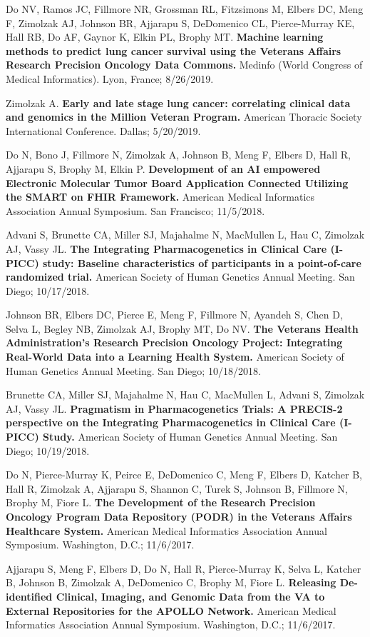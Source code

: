 \documentclass[10pt]{article}
\begin{document}
Do NV, Ramos JC, Fillmore NR, Grossman RL, Fitzsimons M, Elbers DC,
Meng F, Zimolzak AJ, Johnson BR, Ajjarapu S, DeDomenico CL,
Pierce-Murray KE, Hall RB, Do AF, Gaynor K, Elkin PL, Brophy MT.
\textbf{Machine learning methods to predict lung cancer survival using
  the Veterans Affairs Research Precision Oncology Data Commons.}
Medinfo (World Congress of Medical Informatics). Lyon, France;
8/26/2019.

Zimolzak A. \textbf{Early and late stage lung cancer: correlating
  clinical data and genomics in the Million Veteran Program.} American
Thoracic Society International Conference. Dallas; 5/20/2019.

Do N, Bono J, Fillmore N, Zimolzak A, Johnson B, Meng F, Elbers D,
Hall R, Ajjarapu S, Brophy M, Elkin P. \textbf{Development of an AI
  empowered Electronic Molecular Tumor Board Application Connected
  Utilizing the SMART on FHIR Framework.} American Medical Informatics
Association Annual Symposium. San Francisco; 11/5/2018.

Advani S, Brunette CA, Miller SJ, Majahalme N, MacMullen L, Hau C,
Zimolzak AJ, Vassy JL. \textbf{The Integrating Pharmacogenetics in
  Clinical Care (I-PICC) study: Baseline characteristics of
  participants in a point-of-care randomized trial.} American Society
of Human Genetics Annual Meeting. San Diego; 10/17/2018.

Johnson BR, Elbers DC, Pierce E, Meng F, Fillmore N, Ayandeh S, Chen
D, Selva L, Begley NB, Zimolzak AJ, Brophy MT, Do NV. \textbf{The
  Veterans Health Administration's Research Precision Oncology
  Project: Integrating Real-World Data into a Learning Health System.}
American Society of Human Genetics Annual Meeting. San Diego;
10/18/2018.

Brunette CA, Miller SJ, Majahalme N, Hau C, MacMullen L, Advani S,
Zimolzak AJ, Vassy JL. \textbf{Pragmatism in Pharmacogenetics Trials:
  A PRECIS-2 perspective on the Integrating Pharmacogenetics in
  Clinical Care (I-PICC) Study.} American Society of Human Genetics
Annual Meeting. San Diego; 10/19/2018.

Do N, Pierce-Murray K, Peirce E, DeDomenico C, Meng F, Elbers D,
Katcher B, Hall R, Zimolzak A, Ajjarapu S, Shannon C, Turek S, Johnson
B, Fillmore N, Brophy M, Fiore L. \textbf{The Development of the
  Research Precision Oncology Program Data Repository (PODR) in the
  Veterans Affairs Healthcare System.} American Medical Informatics
Association Annual Symposium. Washington, D.C.; 11/6/2017.

Ajjarapu S, Meng F, Elbers D, Do N, Hall R, Pierce-Murray K, Selva L,
Katcher B, Johnson B, Zimolzak A, DeDomenico C, Brophy M, Fiore L.
\textbf{Releasing De-identified Clinical, Imaging, and Genomic Data
  from the VA to External Repositories for the APOLLO Network.}
American Medical Informatics Association Annual Symposium. Washington,
D.C.; 11/6/2017.
\end{document}
